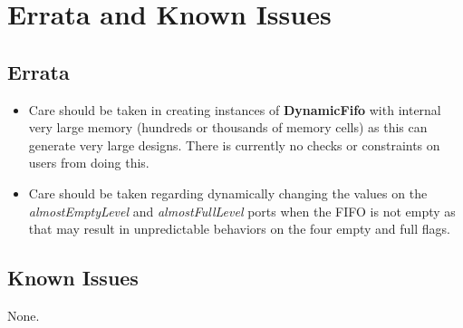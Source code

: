 \section{Errata and Known Issues}

\subsection{Errata}
\begin{itemize}
      \item{
            Care should be taken in creating instances of \textbf{DynamicFifo} 
            with internal very large memory (hundreds or thousands of memory 
            cells) as this can generate very large designs. There is currently 
            no checks or constraints on users from doing this.
            }
      \item{
            Care should be taken regarding dynamically changing the values on 
            the \textit{almostEmptyLevel} and \textit{almostFullLevel} ports 
            when the FIFO is not empty as that may result in unpredictable 
            behaviors on the four empty and full flags.
            }
\end{itemize}

\subsection{Known Issues}
None.
